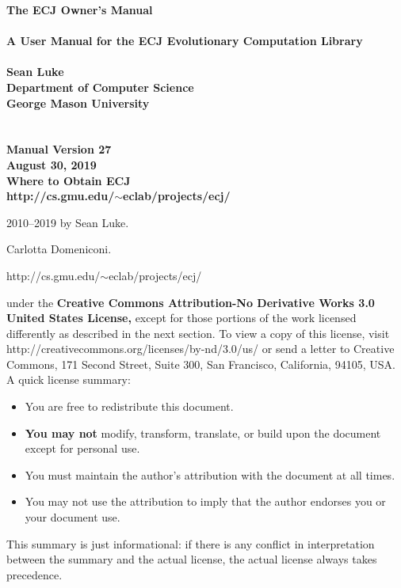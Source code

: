 \documentclass[twoside,10pt]{book}
\newcommand\booktitle{The ECJ Owner's Manual}
\newcommand\reference[1]{\vspace{0.5em}\hfill{\parbox{6in}{\raggedleft\noindent\textsf{#1}}}}
\begin{document}
\noindent\huge\bf \booktitle\\
\\
{\large\rm A User Manual for the ECJ Evolutionary Computation Library}\\
\\
\Large\bf Sean Luke\\
{\large\rm 
Department of Computer Science\\
George Mason University}
\\
\\
\\
\large\rm {\bf Manual Version 27}\\
\large\rm August 30, 2019\\

\vspace{5.6in}
\noindent\Large\bf Where to Obtain ECJ\\
\large\rm http:/\!/cs.gmu.edu/\!\(\sim\)eclab/projects/ecj/

\clearpage

\small 
{}  2010--2019 by Sean Luke.

\vspace{0.25in}
 Carlotta Domeniconi.

\vspace{0.25in}


\reference{http:/\!/cs.gmu.edu/\!\(\sim\)eclab/projects/ecj/}

\vspace{0.15in}

\vspace{0.15in}
	 under the {\bf Creative Commons Attribution-No Derivative Works 3.0 United States License,} except for those portions of the work licensed differently as described in the next section. To view a copy of this license, visit http:/\!/creativecommons.org/licenses/by-nd/3.0/us/ or send a letter to Creative Commons, 171 Second Street, Suite 300, San Francisco, California, 94105, USA.  A quick license summary:
	\begin{itemize}
	\item You are free to redistribute this document.
	\vspace{-0.5em}\item {\bf You may not} modify, transform, translate, or build upon the document except for personal use.   
	\vspace{-0.5em}\item You must maintain the author's attribution with the document at all times.
	\vspace{-0.5em}\item You may not use the attribution to imply that the author endorses you or your document use.  
	\end{itemize}
	This summary is just informational: if there is any conflict in interpretation between the summary and the actual license, the actual license always takes precedence.
\end{document}
